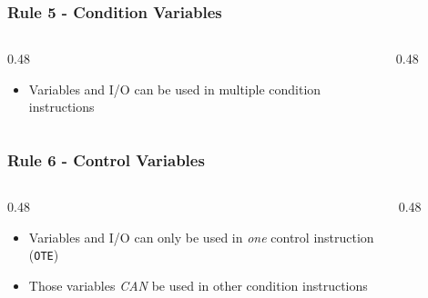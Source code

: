 \begin{frame}
    \frametitle{Rule 5 - Condition Variables}

    \begin{columns}
        \begin{column}{0.48\linewidth}
            \begin{itemize}
                \item Variables and I/O can be used in multiple condition instructions
            \end{itemize}
        \end{column}
        \begin{column}{0.48\linewidth}
            \begin{figure}
                \centering
                \resizebox{\linewidth}{!}{
                    
                }
            \end{figure}
        \end{column}
    \end{columns}
\end{frame}

\begin{frame}
    \frametitle{Rule 6 - Control Variables}

    \begin{columns}
        \begin{column}{0.48\linewidth}
            \begin{itemize}
                \item Variables and I/O can only be used in \emph{one} control instruction (\texttt{OTE})
                \item Those variables \emph{CAN} be used in other condition instructions
            \end{itemize}
        \end{column}
        \begin{column}{0.48\linewidth}
            \begin{figure}
                \centering
                \resizebox{\linewidth}{!}{
                    
                }

                \vspace{0.5em}

                \resizebox{\linewidth}{!}{
                    
                }
            \end{figure}
        \end{column}
    \end{columns}
\end{frame}

